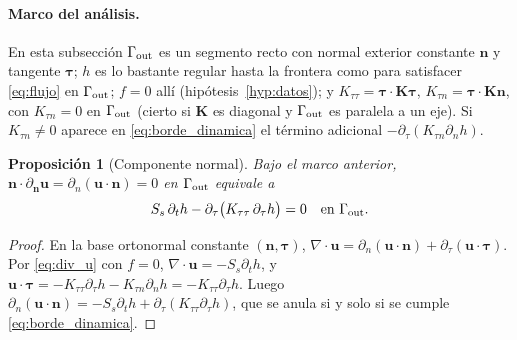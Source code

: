 \documentclass[11pt]{article}
\numberwithin{equation}{section}
\theoremstyle{plain}
\newtheorem{proposition}[theorem]{Proposición}
\theoremstyle{definition}
\theoremstyle{remark}
\newcommand{\bu}{\mathbf{u}}
\newcommand{\bK}{\mathbf{K}}
\newcommand{\bn}{\mathbf{n}}
\begin{document}
\paragraph{Marco del análisis.} En esta subsección $\Gamma_{\rm out}$ es un segmento recto con normal exterior constante $\bn$ y tangente $\boldsymbol\tau$;
$h$ es lo bastante regular hasta la frontera como para satisfacer \eqref{eq:flujo} en $\Gamma_{\rm out}$; $f=0$ allí (hipótesis~\ref{hyp:datos}); y
$K_{\tau\tau}=\boldsymbol\tau\cdot\bK\boldsymbol\tau$, $K_{\tau n}=\boldsymbol\tau\cdot\bK\bn$, con $K_{\tau n}=0$ en $\Gamma_{\rm out}$ (cierto si $\bK$ es diagonal y $\Gamma_{\rm out}$ es
paralela a un eje). Si $K_{\tau n}\ne0$ aparece en \eqref{eq:borde_dinamica} el término adicional $-\partial_\tau(K_{\tau n}\partial_nh)$.

\begin{proposition}[Componente normal]\label{prop:salida_normal}
Bajo el marco anterior, $\bn\cdot\partial_{\bn}\bu=\partial_n(\bu\cdot\bn)=0$ en $\Gamma_{\rm out}$ equivale a
\begin{equation}
S_s\,\partial_th-\partial_\tau\bigl(K_{\tau\tau}\,\partial_\tau h\bigr)=0\quad\text{en }\Gamma_{\rm out}.
\label{eq:borde_dinamica}
\end{equation}
\end{proposition}
\begin{proof}
En la base ortonormal constante $(\bn,\boldsymbol\tau)$, $\nabla\!\cdot\bu=\partial_n(\bu\cdot\bn)+\partial_\tau(\bu\cdot\boldsymbol\tau)$. Por \eqref{eq:div_u} con $f=0$,
$\nabla\!\cdot\bu=-S_s\partial_th$, y $\bu\cdot\boldsymbol\tau=-K_{\tau\tau}\partial_\tau h-K_{\tau n}\partial_nh=-K_{\tau\tau}\partial_\tau h$. Luego
$\partial_n(\bu\cdot\bn)=-S_s\partial_th+\partial_\tau(K_{\tau\tau}\partial_\tau h)$, que se anula si y solo si se cumple \eqref{eq:borde_dinamica}.
\end{proof}
\end{document}
